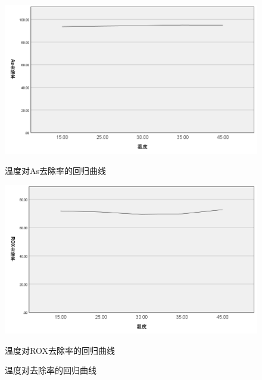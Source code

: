 \documentclass[AutoFakeBold]{ctexart}
\begin{document}
	\begin{figure}[H]
		\centering
		\begin{minipage}{0.45\textwidth}
			\centering
			\includegraphics[width=\linewidth]{temAs.png}
			\caption*{温度对As去除率的回归曲线}
			\label{fig:image1}
		\end{minipage}
		\hfill
		\begin{minipage}{0.45\textwidth}
			\centering
			\includegraphics[width=\linewidth]{temROX.png}
			\caption*{温度对ROX去除率的回归曲线}
			\label{fig:image2}
		\end{minipage}
		\caption{温度对去除率的回归曲线}
	\end{figure}
\end{document}
